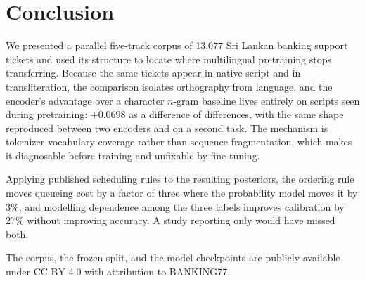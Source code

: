 \section{Conclusion}
\label{sec:conclusion}

We presented a parallel five-track corpus of 13{,}077 Sri Lankan banking support
tickets and used its structure to locate where multilingual pretraining stops
transferring. Because the same tickets appear in native script and in
transliteration, the comparison isolates orthography from language, and the
encoder's advantage over a character $n$-gram baseline lives entirely on scripts
seen during pretraining: $+0.0698$ as a difference of differences, with the same
shape reproduced between two encoders and on a second task. The mechanism is
tokenizer vocabulary coverage rather than sequence fragmentation, which makes it
diagnosable before training and unfixable by fine-tuning.

Applying published scheduling rules to the resulting posteriors, the ordering
rule moves queueing cost by a factor of three where the probability model moves
it by 3\%, and modelling dependence among the three labels improves calibration
by 27\% without improving accuracy. A study reporting only \macrof{} would have
missed both.

The corpus, the frozen split, and the model checkpoints are publicly available
under CC BY 4.0 with attribution to BANKING77.
\ifblind\relax{}\fi
